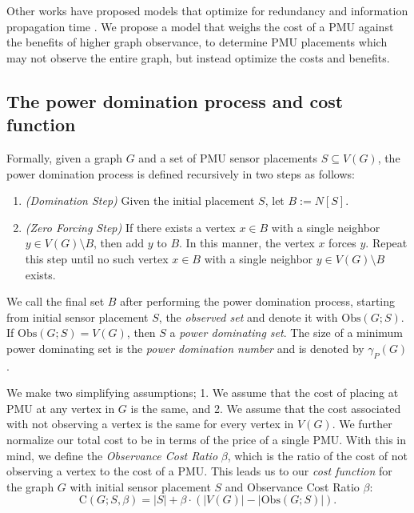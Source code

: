 \documentclass{article}
\begin{document}
    Other works have proposed models that optimize for redundancy \cite{PCW2010, BCF2023} and information propagation time \cite{FHK2016, BCFHS2019}.
    We propose a model that weighs the cost of a PMU against the benefits of higher graph observance, to determine PMU placements which may not observe the entire graph, but instead optimize the costs and benefits.
    
    \subsection{The power domination process and cost function}
        Formally, given a graph $G$ and a set of PMU sensor placements $S\subseteq V(G)$, the power domination process is defined recursively in two steps as follows:
        \begin{enumerate}
        	\item
                \emph{(Domination Step)} Given the initial placement $S$, let $B:=N[S]$.
        	\item
                \emph{(Zero Forcing Step)} If there exists a vertex $x\in B$ with a single neighbor $y\in V(G)\setminus B$, then add $y$ to $B$.
                In this manner, the vertex $x$ forces $y$.
                Repeat this step until no such vertex $x\in B$ with a single neighbor $y\in V(G)\setminus B$ exists.
        \end{enumerate}
        
        We call the final set $B$ after performing the power domination process, starting from initial sensor placement $S$, the \emph{observed set} and denote it with $\mathrm{Obs}(G;S)$.
        If $\mathrm{Obs}(G;S)=V(G)$, then $S$ a \emph{power dominating set}.
        The size of a minimum power dominating set is the \emph{power domination number} and is denoted by $\gamma_P(G)$.
        
        We make two simplifying assumptions; 1. We assume that the cost of placing at PMU at any vertex in $G$ is the same, and 2. We assume that the cost associated with not observing a vertex is the same for every vertex in $V(G)$.
        We further normalize our total cost to be in terms of the price of a single PMU.
        With this in mind, we define the \emph{Observance Cost Ratio} $\beta$, which is the ratio of the cost of not observing a vertex to the cost of a PMU.
        This leads us to our \emph{cost function} for the graph $G$ with initial sensor placement $S$ and Observance Cost Ratio $\beta$:
        \[
            \mathrm{C}(G;S,\beta)=|S|+\beta\cdot (|V(G)|-|\mathrm{Obs}(G;S)|).
        \]
        
\end{document}
